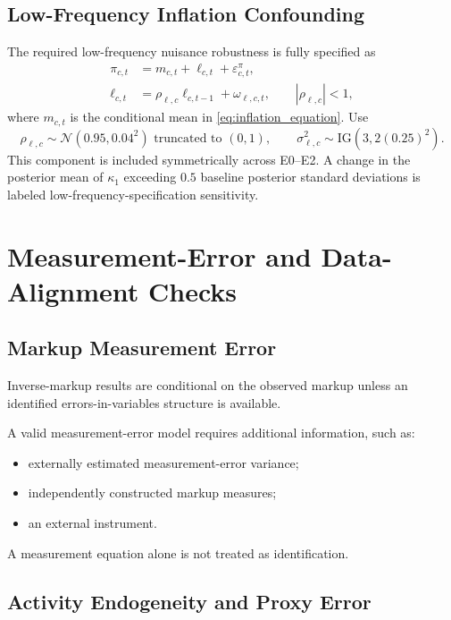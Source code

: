 \documentclass[11pt]{article}
\newcommand{\Normal}{\mathcal{N}}
\begin{document}
\subsection{Low-Frequency Inflation Confounding}

The required low-frequency nuisance robustness is fully specified as
\begin{align}
\pi_{c,t}&=m_{c,t}+\ell_{c,t}+\varepsilon_{c,t}^\pi,\\
\ell_{c,t}&=\rho_{\ell,c}\ell_{c,t-1}+\omega_{\ell,c,t},
\qquad |\rho_{\ell,c}|<1,
\end{align}
where $m_{c,t}$ is the conditional mean in \cref{eq:inflation_equation}. Use
\begin{equation}
\rho_{\ell,c}\sim\Normal(0.95,0.04^2)\text{ truncated to }(0,1),
\qquad
\sigma_{\ell,c}^2\sim\mathrm{IG}(3,2(0.25)^2).
\end{equation}
This component is included symmetrically across E0--E2. A change in the posterior mean of $\kappa_1$ exceeding $0.5$ baseline posterior standard deviations is labeled low-frequency-specification sensitivity.

\section{Measurement-Error and Data-Alignment Checks}

\subsection{Markup Measurement Error}

Inverse-markup results are conditional on the observed markup unless an identified errors-in-variables structure is available.

A valid measurement-error model requires additional information, such as:
\begin{itemize}
\item externally estimated measurement-error variance;
\item independently constructed markup measures;
\item an external instrument.
\end{itemize}

A measurement equation alone is not treated as identification.

\subsection{Activity Endogeneity and Proxy Error}
\end{document}

